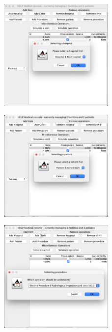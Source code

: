 \documentclass{article}
\begin{document}
\begin{figure}
  \begin{center}
    \includegraphics[width=0.5\textwidth]{./figures/Operation/Operation_3.png}
  \end{center}
\end{figure}

\begin{figure}
  \begin{center}
    \includegraphics[width=0.5\textwidth]{./figures/Operation/Operation_4.png}
  \end{center}
\end{figure}

\begin{figure}
  \begin{center}
    \includegraphics[width=0.5\textwidth]{./figures/Operation/Operation_5.png}
  \end{center}
\end{figure}
\end{document}
